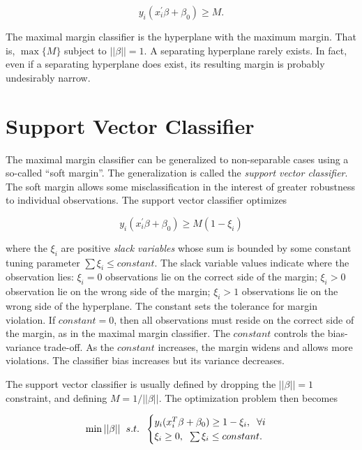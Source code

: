 \documentclass[]{book}
\begin{document}
\[y_i (x_i^{'} \beta + \beta_0) \ge M.\]

The maximal margin classifier is the hyperplane with the maximum margin. That is, \(\max \{M\}\) subject to \(||\beta|| = 1\). A separating hyperplane rarely exists. In fact, even if a separating hyperplane does exist, its resulting margin is probably undesirably narrow.

\hypertarget{support-vector-classifier}{%
\section{Support Vector Classifier}\label{support-vector-classifier}}

The maximal margin classifier can be generalized to non-separable cases using a so-called ``soft margin''. The generalization is called the \emph{support vector classifier}. The soft margin allows some misclassification in the interest of greater robustness to individual observations. The support vector classifier optimizes

\[y_i (x_i^{'} \beta + \beta_0) \ge M(1 - \xi_i)\]

where the \(\xi_i\) are positive \emph{slack variables} whose sum is bounded by some constant tuning parameter \(\sum{\xi_i} \le constant\). The slack variable values indicate where the observation lies: \(\xi_i = 0\) observations lie on the correct side of the margin; \(\xi_i > 0\) observation lie on the wrong side of the margin; \(\xi_i > 1\) observations lie on the wrong side of the hyperplane. The constant sets the tolerance for margin violation. If \(constant = 0\), then all observations must reside on the correct side of the margin, as in the maximal margin classifier. The \(constant\) controls the bias-variance trade-off. As the \(constant\) increases, the margin widens and allows more violations. The classifier bias increases but its variance decreases.

The support vector classifier is usually defined by dropping the \(||\beta|| = 1\) constraint, and defining \(M = 1 / ||\beta||\). The optimization problem then becomes

\[
 \min ||\beta|| \hspace{2mm} s.t. \hspace{2mm}  
  \begin{cases} 
   y_i(x_i^T\beta + \beta_0) \ge 1 - \xi_i, \hspace{2mm} \forall i &  \\
   \xi_i \ge 0, \hspace{2mm} \sum \xi_i \le constant.      
  \end{cases}
\]
\end{document}
